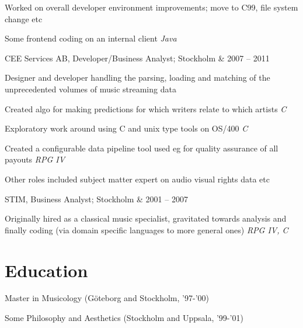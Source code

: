 \documentclass[letterpaper]{scrartcl}
\begin{document}
\begin{list1}
\begin{list2}
    \begin{list3}
      \item Worked on overall developer environment improvements; move to C99, file system change etc
    \end{list3}
    \item Some frontend coding on an internal client \hfill \emph{Java}
  \end{list2}

\item \begin{tabular1bold} CEE Services AB, Developer/Business Analyst; Stockholm & 2007 -- 2011 \end{tabular1bold}

  \begin{list2}
    \item Designer and developer handling the parsing, loading and matching of the unprecedented volumes of music streaming data
    \begin{list3}
      \item Created algo for making predictions for which writers relate to which artists \hfill \emph{C}
      \item Exploratory work around using C and unix type tools on OS/400 \hfill \emph{C}
    \end{list3}
    \item Created a configurable data pipeline tool used eg for quality assurance of all payouts \hfill \emph{RPG IV}
    \item Other roles included subject matter expert on audio visual rights data etc
  \end{list2}

\item \begin{tabular1bold} STIM, Business Analyst; Stockholm & 2001 -- 2007 \end{tabular1bold}

  \begin{list2}
  \item Originally hired as a classical music specialist, gravitated towards analysis and finally coding (via domain specific languages to more general ones)  \hfill \emph{RPG IV, C}
  \end{list2}


\end{list1}

\section*{Education}
\begin{list1}
\item
  \begin{tabular1bold}Master in Musicology (Göteborg and Stockholm, '97-'00)\end{tabular1bold}
  \begin{tabular1bold}Some Philosophy and Aesthetics (Stockholm and Uppsala, '99-'01)\end{tabular1bold}
\end{list1}
\end{document}

